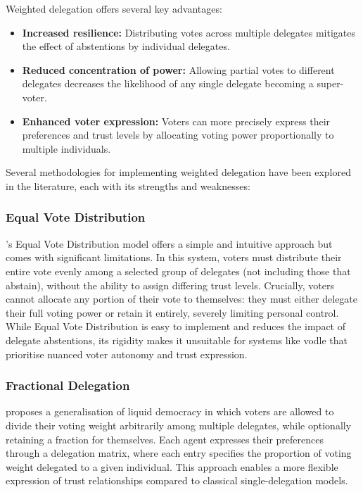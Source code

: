 Weighted delegation offers several key advantages:
\begin{itemize}
  \item \textbf{Increased resilience:} Distributing votes across multiple delegates mitigates the effect of abstentions by individual delegates.
  \item \textbf{Reduced concentration of power:} Allowing partial votes to different delegates decreases the likelihood of any single delegate becoming a super-voter.
  \item \textbf{Enhanced voter expression:} Voters can more precisely express their preferences and trust levels by allocating voting power proportionally to multiple individuals.
\end{itemize}

Several methodologies for implementing weighted delegation have been explored in the literature, each with its strengths and weaknesses:

\subsubsection*{Equal Vote Distribution~\citep{degrave2014}}
\citeauthor{degrave2014}'s Equal Vote Distribution model offers a simple and intuitive approach but comes with significant limitations. In this system, voters must distribute their entire vote evenly among a selected group of delegates (not including those that abstain), without the ability to assign differing trust levels. Crucially, voters cannot allocate any portion of their vote to themselves: they must either delegate their full voting power or retain it entirely, severely limiting personal control. While Equal Vote Distribution is easy to implement and reduces the impact of delegate abstentions, its rigidity makes it unsuitable for systems like vodle that prioritise nuanced voter autonomy and trust expression.

\subsubsection*{Fractional Delegation~\citep{bersetche2024}}

\citeauthor{bersetche2024} proposes a generalisation of liquid democracy in which voters are allowed to divide their voting weight arbitrarily among multiple delegates, while optionally retaining a fraction for themselves. Each agent expresses their preferences through a delegation matrix, where each entry specifies the proportion of voting weight delegated to a given individual. This approach enables a more flexible expression of trust relationships compared to classical single-delegation models.

